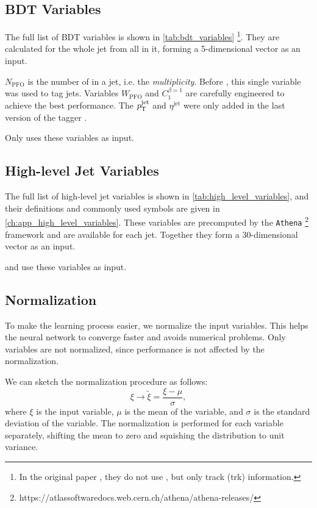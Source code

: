 \subsection{BDT Variables}
\label{sec:bdt_variables}

The full list of BDT variables is shown in \cref{tab:bdt_variables} \cite{bdt_tag} \footnote{In the original paper \cite{bdt_tag}, they do not use \PFOs, but only track (trk) information.}.
They are calculated for the whole jet from all \PFOs in it, forming a 5-dimensional vector as an input.

$N_\mathrm{PFO}$ is the number of \PFOs in a jet, i.e. the \emph{multiplicity}.
Before \bdt, this single variable was used to tag jets. 
Variables $W_\mathrm{PFO}$ and $C_1^{\beta = 1}$ are carefully engineered to achieve the best performance.
The $p_\text{T}^{\text{jet}}$ and $\eta^\mathrm{jet}$ were only added in the last version of the tagger \cite{bdt_tag}.

Only \bdt uses these variables as input.

\subsection{High-level Jet Variables}
\label{sec:high_level_variables}

The full list of high-level jet variables is shown in \cref{tab:high_level_variables}, and their definitions and commonly used symbols are given in \cref{ch:app_high_level_variables}.
These variables are precomputed by the \texttt{Athena} \footnote{https://atlassoftwaredocs.web.cern.ch/athena/athena-releases/} framework and are available for each jet.
Together they form a 30-dimensional vector as an input.

\fc and \highway use these variables as input.

\subsection{Normalization}
\label{sec:input_normalization}
To make the learning process easier, we normalize the input variables.
This helps the neural network to converge faster and avoids numerical problems.
Only \bdt variables are not normalized, since \bdt performance is not affected by the normalization.

We can sketch the normalization procedure as follows:
\begin{equation}
    \xi \rightarrow \tilde{\xi} = \frac{\xi - \mu}{\sigma},
\end{equation}
where $\xi$ is the input variable, $\mu$ is the mean of the variable, and $\sigma$ is the standard deviation of the variable.
The normalization is performed for each variable separately, shifting the mean to zero and squishing the distribution to unit variance.

